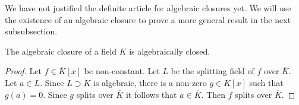     \begin{remark}
        We have not justified the definite article for algebraic closures yet. We will use the existence of an algebraic closure to prove a more general result in the next subsubsection. 
    \end{remark}
    \begin{theorem}
        The algebraic closure of a field $K$ is algebraically closed. 
    \end{theorem}
    \begin{proof}
        Let $f\in \overline{K}[x]$ be non-constant. Let $L$ be the splitting field of $f$ over $\overline{K}$. Let $a\in L$. Since $L\supset K$ is algebraic, there is a non-zero $g\in K[x]$ such that $g(a)=0$. Since $g$ splits over $\overline{K}$ it follows that $a\in \overline{K}$. Then $f$ splits over $\overline{K}$.  
    \end{proof}
